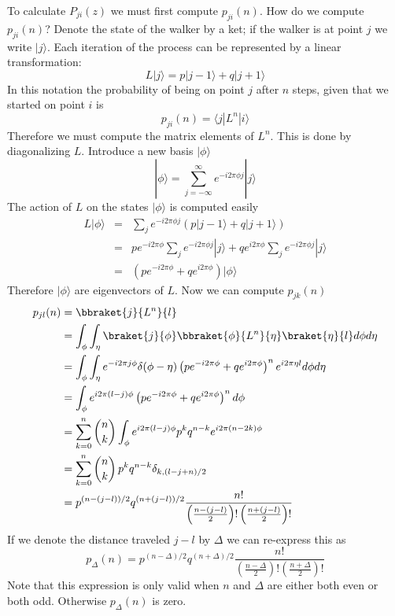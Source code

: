 \documentclass{article}
\begin{document}
To calculate $P_{ji}(z)$ we must first compute $p_{ji}(n)$. How do we compute $p_{ji}(n)$? Denote the state of the walker by a ket; if the walker is at point $j$ we write $|j\rangle$. Each iteration of the process can be represented by a linear transformation:\begin{equation}
L|j\rangle=p|j-1\rangle+q|j+1\rangle \end{equation}
In this notation the probability of being on point $j$ after $n$ steps, given that we started on point $i$ is\begin{equation}
p_{ji}(n)=\langle j|L^{n}|i\rangle\end{equation}
Therefore we must compute the matrix elements of $L^{n}$. This is done by diagonalizing $L$. Introduce a new basis $|\phi\rangle$ \begin{equation}
|\phi\rangle=\sum_{j=-\infty}^{\infty}e^{-i2\pi\phi j}|j\rangle \end{equation}
The action of $L$ on the states $|\phi\rangle$ is computed easily\begin{eqnarray*}
L|\phi\rangle & = & \sum_{j}e^{-i2\pi\phi j}\left(p|j-1\rangle+q|j+1\rangle\right)\\
 & = & pe^{-i2\pi\phi}\sum_{j}e^{-i2\pi\phi j}|j\rangle+qe^{i2\pi\phi}\sum_{j}e^{-i2\pi\phi j}|j\rangle\\
 & = & \left(pe^{-i2\pi\phi}+qe^{i2\pi\phi}\right)|\phi\rangle\end{eqnarray*}
Therefore $|\phi\rangle$ are eigenvectors of $L$. Now we can compute $p_{jk}(n)$ \begin{align}
p_{jl}(n) & = \bbraket{j}{L^n}{l} \\
& = \int_{\phi} \int_{\eta} \braket{j}{\phi} \bbraket{\phi}{L^n}{\eta} \braket{\eta}{l} d\phi d\eta \\
& = \int_{\phi}\int_{\eta}e^{-i 2 \pi j \phi} \delta(\phi-\eta)
\left(p e^{-i 2 \pi \phi} + q e^{i 2 \pi \phi} \right)^{n}
e^{i 2 \pi \eta l} d\phi d\eta \\
& = \int_{\phi} e^{i 2 \pi (l-j)\phi}
\left(p e^{-i2\pi\phi} + q e^{i 2 \pi \phi} \right)^{n} d\phi \\
& = \sum_{k=0}^{n} \binom{n}{k} \int_{\phi} e^{i 2 \pi (l-j) \phi} p^{k} q^{n-k} e^{i 2 \pi (n-2k) \phi} \\
& = \sum_{k=0}^{n} \binom{n}{k} \, p^{k}q^{n-k}\delta_{k,(l-j+n)/2}\\
& = p^{\left(n-(j-l)\right)/2} q^{\left(n+(j-l)\right)/2}\frac{n!}{\left(\frac{n-(j-l)}{2}\right)!\left(\frac{n+(j-l)}{2}\right)!}\end{align}
If we denote the distance traveled $j-l$ by $\Delta$ we can re-express
this as \begin{equation}
p_{\Delta}(n)=p^{(n-\Delta)/2}q^{(n+\Delta)/2}\frac{n!}{\left(\frac{n-\Delta}{2}\right)!\left(\frac{n+\Delta}{2}\right)!} \end{equation}
Note that this expression is only valid when $n$ and $\Delta$ are either both even or both odd. Otherwise $p_{\Delta}(n)$ is zero.
\end{document}
